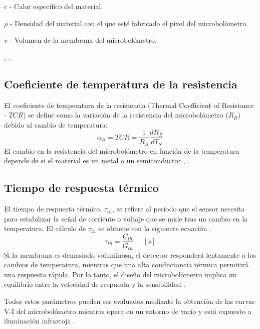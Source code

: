         
        $c$ - Calor específico del material.
        
        
        $\rho$ - Densidad del material con el que esté fabricado el pixel del microbolómetro.
        
         
        $v$ - Volumen de la membrana del microbolómetro.
        
        \cite{BlancoMDA}, \cite{Jimenez} \cite{Bhan2009}.
        
        \subsection{Coeficiente de temperatura de la resistencia}
        El coeficiente de temperatura de la resistencia (Thermal Coefficient of Resistance - $TCR$) se define como la variación de la resistencia del microbolómetro ($R_{B}$) debido al cambio de temperatura:
        \begin{equation}
        \alpha_{B} = TCR =\frac{1}{R_{B}}\frac{dR_{B}}{dT_{S}}
        \label{eq:TCR}
        \end{equation}
        El cambio en la resistencia del microbolómetro en función de la temperatura depende de si el material es un metal o un semiconductor \cite{Budzier}, \cite{Wei2015}.  
               
        \subsection{Tiempo de respuesta térmico}
         El tiempo de respuesta térmico, $\tau_{th}$, se refiere al período que el sensor necesita para estabilizar la señal de corriente o voltaje que se mide tras un cambio en la temperatura. El cálculo de $\tau_{th}$ se obtiene con la siguiente ecuación \cite{Jimenez}.
        \begin{equation}
        \tau_{th} =\frac{C_{th}}{G_{th}}\phantom{abc} [s]
        \label{eq:Tth}
        \end{equation}          
Si la membrana es demasiado voluminosa, el detector responderá lentamente a los cambios de temperatura, mientras que una alta conductancia térmica permitirá una respuesta rápida. Por lo tanto, el diseño del microbolómetro implica un equilibrio entre la velocidad de respuesta y la sensibilidad \cite{Jimenez}.        
        

Todos estos parámetros pueden ser evaluados mediante la obtención de las curvas V-I del microbolómetro mientras opera en un entorno de vacío y está expuesto a iluminación infrarroja \cite{Hernandez2021}.

